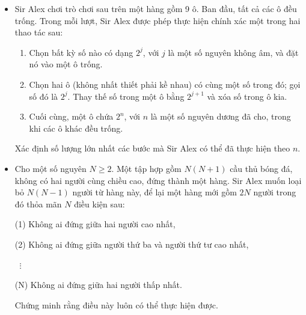 \documentclass[11pt]{scrartcl}
\begin{document}
\begin{itemize}[label=, leftmargin=0em, itemsep=-0em]
    \item \begin{btvn}
        Sir Alex chơi trò chơi sau trên một hàng gồm 9 ô. Ban đầu, tất cả các ô đều trống. Trong mỗi lượt, Sir Alex được phép thực hiện chính xác một trong hai thao tác sau:
        \begin{enumerate}
            \item  Chọn bất kỳ số nào có dạng $2^j$, với $j$ là một số nguyên không âm, và đặt nó vào một ô trống.
            \item Chọn hai ô (không nhất thiết phải kề nhau) có cùng một số trong đó; gọi số đó là $2^j$. Thay thế số trong một ô bằng $2^{j+1}$ và xóa số trong ô kia.
            \item Cuối cùng, một ô chứa $2^n$, với $n$ là một số nguyên dương đã cho, trong khi các ô khác đều trống.
        \end{enumerate}
         Xác định số lượng lớn nhất các bước mà Sir Alex có thể đã thực hiện theo $n$.
    \end{btvn}

    \item \begin{btvn}
        Cho một số nguyên $N \ge 2$. Một tập hợp gồm $N(N + 1)$ cầu thủ bóng đá, không có hai người cùng chiều cao, đứng thành một hàng. Sir Alex muốn loại bỏ $N(N - 1)$ người từ hàng này, để lại một hàng mới gồm $2N$ người trong đó thỏa mãn $N$ điều kiện sau:

        (1) Không ai đứng giữa hai người cao nhất,

        (2) Không ai đứng giữa người thứ ba và người thứ tư cao nhất,

        $\;\;\vdots$

        (N) Không ai đứng giữa hai người thấp nhất.

        Chứng minh rằng điều này luôn có thể thực hiện được.
    \end{btvn}



\end{itemize}
\end{document}
